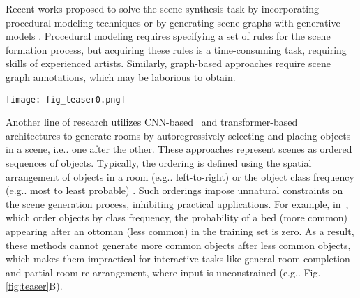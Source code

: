 \documentclass{article}
\makeatletter
\DeclareRobustCommand\onedot{\futurelet\@let@token\@onedot}
\def\@onedot{\ifx\@let@token.\else.\null\fi\xspace}
\def\eg{e.g\onedot} \def\Eg{E.g\onedot}
\def\ie{i.e\onedot} \def\Ie{I.e\onedot}
\makeatother
\begin{document}
Recent works proposed to solve the scene synthesis task by incorporating
procedural modeling techniques \cite{Qi2018CVPRa,
Prakash2019ICRA, Kar2019ICCV, Devaranjan2020ECCV} or by generating scene graphs with generative models
\cite{Li2019SIGGRAPH, Wang2019SIGGRAPH, Zhou2019ICCV, Luo2020CVPR,
Purkait2020ECCV, Zhang2020SIGGRAPH, Zhang2020ARXIVa, Keshavarzi2020ARXIV,
Di2020ARXIV}. Procedural modeling requires specifying a set of rules for
the scene formation process, but acquiring these rules is a time-consuming
task, requiring skills of experienced artists. Similarly, graph-based approaches require scene graph annotations, which may be laborious to obtain.

\begin{figure*}
\vspace{-2mm}
\centering
\texttt{[image: fig\_teaser0.png]}
\vspace{-3.6mm}
\caption{{\bf{Motivation}} In addition to fully automatic layout synthesis (A),
our formulation in terms of unordered sets of objects allows our model to be
used for novel interactive applications with versatile user control: scene
completion given any number of existing furniture pieces of any class pinned to
a specific location by the user (B), and object suggestions with user-provided
constraints (object centroid constraint shown in red) (C).}  
\label{fig:teaser}
\vspace{-1.2em}
\end{figure*}

Another line of research utilizes CNN-based~\cite{Wang2018SIGGRAPH, Ritchie2019CVPR} and transformer-based~\cite{Wang2020ARXIV} architectures to generate rooms by autoregressively
selecting and placing objects in a scene, \ie one after
the other.
These approaches represent scenes as ordered
sequences of objects. Typically, the ordering is defined using the spatial
arrangement of objects in a room (\eg left-to-right)
\cite{Jyothi2019ICCV} or the object class frequency (\eg most to least
probable) \cite{Ritchie2019CVPR, Wang2020ARXIV}. Such orderings impose unnatural constraints on the scene generation process, inhibiting practical applications. For example, in~\cite{Ritchie2019CVPR, Wang2020ARXIV}, which order objects by class frequency, the
probability of a bed (more common) appearing after an ottoman (less common) in the training set is zero. As a result, these
methods cannot generate more common objects after less common
objects, which makes them impractical for
interactive tasks like general room completion and partial room re-arrangement, where input is unconstrained (\eg Fig.\ref{fig:teaser}B).
\end{document}
